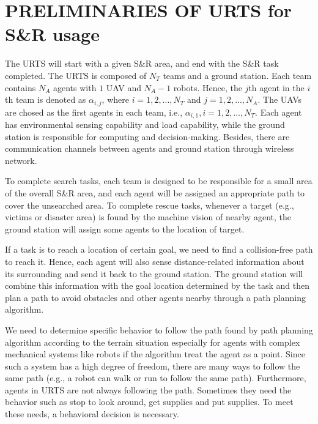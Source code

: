 \documentclass{ieeeaccess}
\begin{document}
\section{PRELIMINARIES OF URTS for S\&R usage}
The URTS will start with a given S\&R area, and end with the S\&R task completed. The URTS is composed of $N_T$ teams and a ground station. Each team contains $N_A$ agents with $1$ UAV and $N_A-1$ robots. Hence, the $j$th agent in the $i$th team is denoted as $\alpha_{i,j}$, where $i=1,2,...,N_T$ and $j=1,2,...,N_A$. The UAVs are chosed as the first agents in each team, i.e., $\alpha_{i,1},i=1,2,\dots,N_T$. Each agent has environmental sensing capability and load capability, while the ground station is responsible for computing and decision-making. Besides, there are communication channels between agents and ground station through wireless network.

To complete search tasks, each team is designed to be responsible for a small area of the overall S\&R area, and each agent will be assigned an appropriate path to cover the unsearched area. To complete rescue tasks, whenever a target (e.g., victims or disaster area) is found by the machine vision of nearby agent, the ground station will assign some agents to the location of target. 

If a task is to reach a location of certain goal, we need to find a collision-free path to reach it. 
Hence, each agent will also sense distance-related information about its surrounding and send it back to the ground station. The ground station will combine this information with the goal location determined by the task and then plan a path to avoid obstacles and other agents nearby through a path planning algorithm.

We need to determine specific behavior to follow the path found by path planning algorithm according to the terrain situation especially for agents with complex mechanical systems like robots if the algorithm treat the agent as a point. Since such a system has a high degree of freedom, there are many ways to follow the same path (e.g., a robot can walk or run to follow the same path). Furthermore, agents in URTS are not always following the path. Sometimes they need the behavior such as stop to look around, get supplies and put supplies. To meet these needs, a behavioral decision is necessary.
\end{document}
